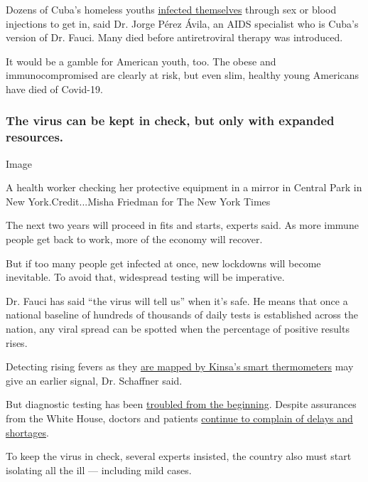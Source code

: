 Dozens of Cuba's homeless youths
\href{https://www.nytimes.com/2012/05/08/health/cubas-aids-sanitariums-fortresses-against-a-viral-foe.html}{infected
themselves} through sex or blood injections to get in, said Dr. Jorge
Pérez Ávila, an AIDS specialist who is Cuba's version of Dr. Fauci. Many
died before antiretroviral therapy was introduced.

It would be a gamble for American youth, too. The obese and
immunocompromised are clearly at risk, but even slim, healthy young
Americans have died of Covid-19.

\hypertarget{the-virus-can-be-kept-in-check-but-only-with-expanded-resources}{%
\subsubsection{The virus can be kept in check, but only with expanded
resources.}\label{the-virus-can-be-kept-in-check-but-only-with-expanded-resources}}

Image

A health worker checking her protective equipment in a mirror in Central
Park in New York.Credit...Misha Friedman for The New York Times

The next two years will proceed in fits and starts, experts said. As
more immune people get back to work, more of the economy will recover.

But if too many people get infected at once, new lockdowns will become
inevitable. To avoid that, widespread testing will be imperative.

Dr. Fauci has said ``the virus will tell us'' when it's safe. He means
that once a national baseline of hundreds of thousands of daily tests is
established across the nation, any viral spread can be spotted when the
percentage of positive results rises.

Detecting rising fevers as they
\href{https://www.nytimes.com/2020/03/18/health/coronavirus-fever-thermometers.html}{are
mapped by Kinsa's smart thermometers} may give an earlier signal, Dr.
Schaffner said.

But diagnostic testing has been
\href{https://www.nytimes.com/2020/03/10/us/coronavirus-testing-delays.html}{troubled
from the beginning}. Despite assurances from the White House, doctors
and patients
\href{https://www.nytimes.com/2020/04/06/health/coronavirus-testing-us.html}{continue
to complain of delays and shortages}.

To keep the virus in check, several experts insisted, the country also
must start isolating all the ill --- including mild cases.

